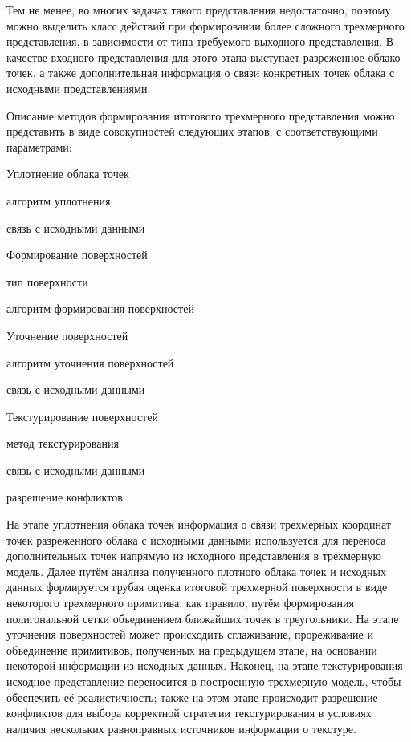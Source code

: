 Тем не менее, во многих задачах такого представления недостаточно, поэтому можно выделить класс действий при формировании более сложного трехмерного представления, в зависимости от типа требуемого выходного представления. В качестве входного представления для этого этапа выступает разреженное облако точек, а также дополнительная информация о связи конкретных точек облака с исходными представлениями.

Описание методов формирования итогового трехмерного представления можно представить в виде совокупностей следующих этапов, с соответствующими параметрами:
\begin{textitemize}
    \item Уплотнение облака точек
    \begin{textitemize}
        \item алгоритм уплотнения
        \item связь с исходными данными
    \end{textitemize}
    \item Формирование поверхностей
    \begin{textitemize}
        \item тип поверхности
        \item алгоритм формирования поверхностей
    \end{textitemize}
    \item Уточнение поверхностей
    \begin{textitemize}
        \item алгоритм уточнения поверхностей
        \item связь с исходными данными
    \end{textitemize}
    \item Текстурирование поверхностей
    \begin{textitemize}
        \item метод текстурирования
        \item связь с исходными данными
        \item разрешение конфликтов
    \end{textitemize}
\end{textitemize}

На этапе уплотнения облака точек информация о связи трехмерных координат точек разреженного облака с исходными данными используется для переноса дополнительных точек напрямую из исходного представления в трехмерную модель. Далее путём анализа полученного плотного облака точек и исходных данных формируется грубая оценка итоговой трехмерной поверхности в виде некоторого трехмерного примитива, как правило, путём формирования полигональной сетки объединением ближайших точек в треугольники. На этапе уточнения поверхностей может происходить сглаживание, прореживание и объединение примитивов, полученных на предыдущем этапе, на основании некоторой информации из исходных данных. Наконец, на этапе текстурирования исходное представление переносится в построенную трехмерную модель, чтобы обеспечить её реалистичность; также на этом этапе происходит разрешение конфликтов для выбора корректной стратегии текстурирования в условиях наличия нескольких равноправных источников информации о текстуре.

